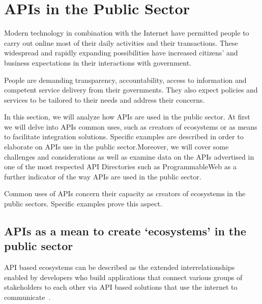 
\chapter{APIs in the Public Sector}

\ifpdf
    \graphicspath{{Chapter2/Figs/Raster/}{Chapter2/Figs/PDF/}{Chapter2/Figs/}}
\else
    \graphicspath{{Chapter2/Figs/Vector/}{Chapter2/Figs/}}
\fi

Modern technology in combination with the Internet have permitted people
to carry out online most of their daily activities and their transactions.
These widespread and rapidly expanding possibilities have increased citizens'
and business expectations in their interactions with government.

People are demanding transparency, accountability, access to information and
competent service delivery from their governments. They also expect policies
and services to be tailored to their needs and address their concerns.

In this section, we will analyze how APIs are used in the public sector.
At first we will delve into APIs common uses, such as creators of ecosystems
or as means to facilitate integration solutions.
Specific examples are described in order to elaborate on APIs use in the public
sector.Moreover, we will
cover some challenges and considerations as well as examine data on the APIs
advertised in one of the most respected API Directories such as
ProgrammableWeb as a further indicator of the way APIs are used in the
public sector.


Common uses of APIs concern their capacity as creators of ecosystems
in the public sectors. Specific examples prove this aspect.


\section{APIs as a mean to create ‘ecosystems’ in the public sector}

API based ecosystems can be described as the extended interrelationships enabled
by developers who build applications that connect various groups of stakeholders
to each other via API based solutions that use the internet to communicate~\citep{api_ecosystems}.

